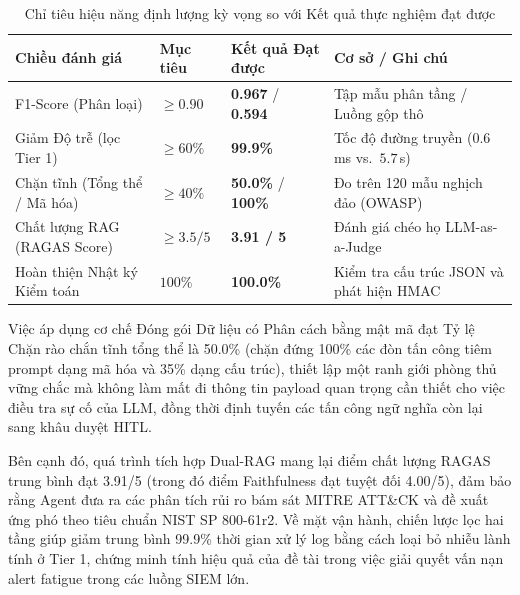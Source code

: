 \documentclass[12pt,a4paper]{article}
\begin{document}
\begin{table}[H]
    \centering
    \setlength{\tabcolsep}{4pt}
    \caption{Chỉ tiêu hiệu năng định lượng kỳ vọng so với Kết quả thực nghiệm đạt được}
    \label{tab:targets}
    \begin{tabular}{>{\raggedright\arraybackslash}p{3.2cm}ll>{\raggedright\arraybackslash}p{5.5cm}}
        \toprule
        \textbf{Chiều đánh giá}      & \textbf{Mục tiêu} & \textbf{Kết quả Đạt được} & \textbf{Cơ sở / Ghi chú}                          \\
        \midrule
        F1-Score (Phân loại)         & $\geq 0.90$       & \textbf{0.967} / \textbf{0.594} & Tập mẫu phân tầng / Luồng gộp thô                \\
        Giảm Độ trễ (lọc Tier 1)     & $\geq 60\%$       & \textbf{99.9\%}           & Tốc độ đường truyền ($0.6$\,ms vs.\ $5.7$\,s)      \\
        Chặn tĩnh (Tổng thể / Mã hóa)& $\geq 40\%$       & \textbf{50.0\%} / \textbf{100\%} & Đo trên 120 mẫu nghịch đảo (OWASP)                \\
        Chất lượng RAG (RAGAS Score) & $\geq 3.5 / 5$    & \textbf{3.91 / 5}         & Đánh giá chéo họ LLM-as-a-Judge                   \\
        Hoàn thiện Nhật ký Kiểm toán & $100\%$           & \textbf{100.0\%}          & Kiểm tra cấu trúc JSON và phát hiện HMAC          \\
        \bottomrule
    \end{tabular}
\end{table}

Việc áp dụng cơ chế Đóng gói Dữ liệu có Phân cách bằng mật mã đạt Tỷ lệ Chặn rào chắn tĩnh tổng thể là 50.0\% (chặn đứng 100\% các đòn tấn công tiêm prompt dạng mã hóa và 35\% dạng cấu trúc), thiết lập một ranh giới phòng thủ vững chắc mà không làm mất đi thông tin payload quan trọng cần thiết cho việc điều tra sự cố của LLM, đồng thời định tuyến các tấn công ngữ nghĩa còn lại sang khâu duyệt HITL.

Bên cạnh đó, quá trình tích hợp Dual-RAG mang lại điểm chất lượng RAGAS trung bình đạt 3.91/5 (trong đó điểm Faithfulness đạt tuyệt đối 4.00/5), đảm bảo rằng Agent đưa ra các phân tích rủi ro bám sát MITRE ATT\&CK và đề xuất ứng phó theo tiêu chuẩn NIST SP 800-61r2. Về mặt vận hành, chiến lược lọc hai tầng giúp giảm trung bình 99.9\% thời gian xử lý log bằng cách loại bỏ nhiễu lành tính ở Tier 1, chứng minh tính hiệu quả của đề tài trong việc giải quyết vấn nạn alert fatigue trong các luồng SIEM lớn.
\end{document}
